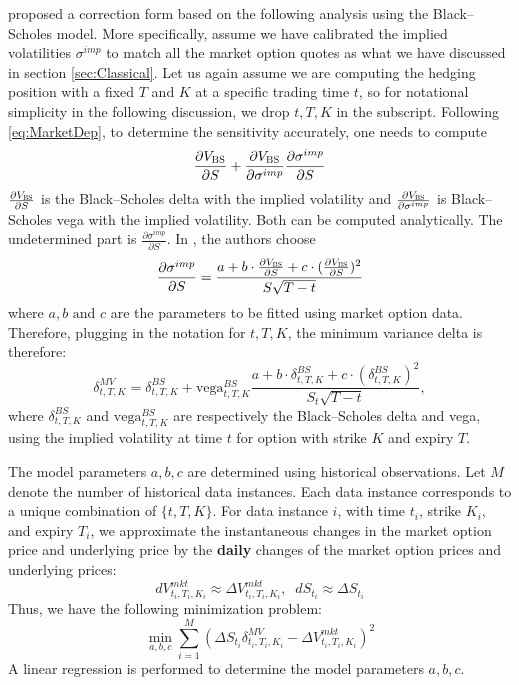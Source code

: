 \documentclass[letterpaper,12pt,titlepage,oneside,final]{book}
\numberwithin{equation}{section}
\theoremstyle{definition}
\newcommand{\BS}{\textsc{BS}}
\newcommand{\Vmkt}{V^{mkt}}
\newcommand{\Smkt}{S}
\newcommand{\MV}{\bf \textsc{MV}}
\begin{document}
\citet{hulloptimal} proposed a correction form  based on the following analysis using the Black–Scholes model. 
More specifically, assume we have calibrated the implied volatilities $\sigma^{imp}$ to match all the market option quotes as what we have discussed in section \ref{sec:Classical}.
Let us again assume we  are computing  the hedging position  with a fixed $T$ and $K$ at a specific trading time $t$, so for notational simplicity in the following discussion, we drop ${t,T,K}$ in the subscript. Following \eqref{eq:MarketDep}, to determine the  sensitivity accurately, one needs to compute 
\begin{equation} \label{eq:Chain}
\frac{\partial V_\BS}{\partial S} + \frac{\partial V_\BS}{\partial \sigma^{imp}}
\frac{\partial \sigma^{imp}}{\partial S}
\end{equation}
$
\frac{\partial V_\BS}{\partial S}
$ is the Black–Scholes delta with the implied volatility and $\frac{\partial V_\BS}{\partial \sigma^{imp}}$ is Black–Scholes vega with the implied volatility. Both can be computed analytically. The undetermined part is $\frac{\partial \sigma^{imp}}{\partial S}$.
In \cite{hulloptimal}, the authors choose  
$$
\frac{\partial \sigma^{imp}}{\partial S} =
\frac{a+b \cdot\frac{\partial V_\BS}{\partial S}+c \cdot (\frac{\partial V_\BS}{\partial S})^2}{S \sqrt{T-t}}
$$
where $a, b \text{ and  } c$ are the parameters to be fitted using  market option data. Therefore, plugging in the notation for $t,T,K$,
the minimum variance delta is therefore:
\begin{equation}
\delta^{MV}_{t,T,K}=\delta^{BS}_{t,T,K}+\text{vega}^{BS}_{t,T,K} \frac{a+b \cdot \delta^{BS}_{t,T,K} +c \cdot (\delta^{BS}_{t,T,K})^2}{S_t\sqrt{T-t}},
\label{eq:HullWhite}
\end{equation}
where $\delta^{BS}_{t,T,K}$ and $\text{vega}^{BS}_{t,T,K}$ are respectively the Black–Scholes delta and vega, using the implied volatility at time $t$ for option with strike $K$ and expiry $T$.

The model parameters $a,b,c$ are determined using historical observations.
Let $M$ denote the number of historical data instances. Each data instance corresponds to a unique combination of $\{t,T,K\}$. For data instance $i$, with time $t_i$, strike $K_i$, and expiry $T_i$, we approximate the instantaneous changes in the market option price and underlying price by the \textbf{daily} changes of the market option prices and underlying prices:
\[
    d\Vmkt_{t_i,T_i,K_i} \approx \Delta \Vmkt_{t_i,T_i,K_i},\;\;
    d\Smkt_{t_i} \approx \Delta S_{t_i}
\]
Thus, we have the following minimization problem:
\[
\min_{a,b,c} \sum_{i=1}^M \left(\Delta S_{t_i} \delta^{MV}_{t_i,T_i,K_i} -\Delta \Vmkt_{t_i,T_i,K_i}   \right)^2
\]
A linear regression is performed to determine the model parameters $a,b,c$.
\end{document}
